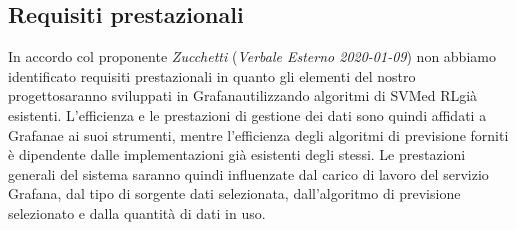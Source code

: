 \subsection{Requisiti prestazionali}
	In accordo col proponente \textit{Zucchetti} (\textit{Verbale Esterno 2020-01-09}) non abbiamo identificato requisiti prestazionali in quanto gli elementi del nostro progetto\glosp saranno sviluppati in Grafana\glosp utilizzando algoritmi di SVM\glosp ed RL\glosp già esistenti. L'efficienza e le prestazioni di gestione dei dati sono quindi affidati a Grafana\glosp e ai suoi strumenti, mentre l'efficienza degli algoritmi di previsione forniti è dipendente dalle implementazioni già esistenti degli stessi. Le prestazioni generali del sistema saranno quindi influenzate dal carico di lavoro del servizio Grafana\glosp, dal tipo di sorgente dati selezionata, dall'algoritmo di previsione selezionato e dalla quantità di dati in uso.
